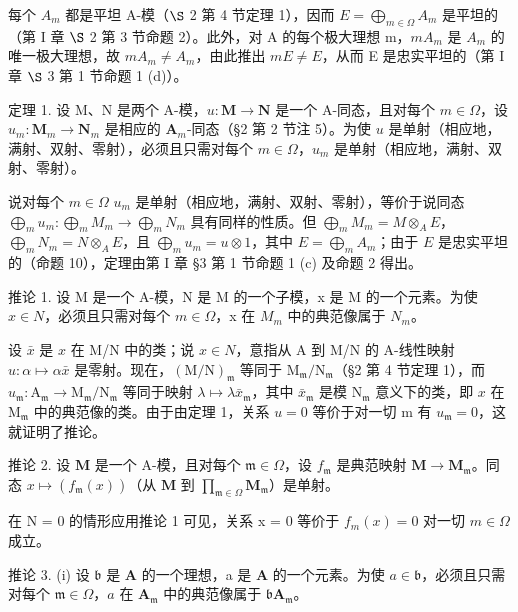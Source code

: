 每个 \(A_{m}\) 都是平坦 A-模（\(\S\) 2 第 4 节定理 1），因而 \(E = \bigoplus_{m \in \Omega} A_{m}\) 是平坦的（第 I 章 \(\S\) 2 第 3 节命题 2）。此外，对 A 的每个极大理想 m，\(mA_{m}\) 是 \(A_{m}\) 的唯一极大理想，故 \(mA_{m} \neq A_{m}\)，由此推出 \(mE \neq E\)，从而 E 是忠实平坦的（第 I 章 \(\S\) 3 第 1 节命题 1 (d)）。

定理 1. 设 M、N 是两个 A-模，\(u: \mathbf{M} \to \mathbf{N}\) 是一个 A-同态，且对每个 \(m \in \Omega\)，设 \(u_m: \mathbf{M}_m \to \mathbf{N}_m\) 是相应的 \(\mathbf{A}_m\)-同态（§2 第 2 节注 5）。为使 \(u\) 是单射（相应地，满射、双射、零射），必须且只需对每个 \(m \in \Omega\)，\(u_m\) 是单射（相应地，满射、双射、零射）。

说对每个 \(m \in \Omega\) \(u_m\) 是单射（相应地，满射、双射、零射），等价于说同态 \(\bigoplus_{m} u_m: \bigoplus_{m} M_m \to \bigoplus_{m} N_m\) 具有同样的性质。但 \(\bigoplus_{m} M_m = M \otimes_A E\)，\(\bigoplus_{m} N_m = N \otimes_A E\)，且 \(\bigoplus_{m} u_m = u \otimes 1\)，其中 \(E = \bigoplus_{m} A_m\)；由于 \(E\) 是忠实平坦的（命题 10），定理由第 I 章 §3 第 1 节命题 1 (c) 及命题 2 得出。

推论 1. 设 M 是一个 A-模，N 是 M 的一个子模，x 是 M 的一个元素。为使 \(x \in N\)，必须且只需对每个 \(m \in \Omega\)，x 在 \(M_{m}\) 中的典范像属于 \(N_{m}\)。

设 \(\bar{x}\) 是 \(x\) 在 M/N 中的类；说 \(x \in N\)，意指从 A 到 M/N 的 A-线性映射 \(u: \alpha \mapsto \alpha \bar{x}\) 是零射。现在，\((\mathrm{M} / \mathrm{N})_{\mathfrak{m}}\) 等同于 \(\mathrm{M}_{\mathfrak{m}} / \mathrm{N}_{\mathfrak{m}}\)（§2 第 4 节定理 1），而 \(u_{\mathfrak{m}}: \mathrm{A}_{\mathfrak{m}} \to \mathrm{M}_{\mathfrak{m}} / \mathrm{N}_{\mathfrak{m}}\) 等同于映射 \(\lambda \mapsto \lambda \bar{x}_{\mathfrak{m}}\)，其中 \(\bar{x}_{\mathfrak{m}}\) 是模 \(\mathrm{N}_{\mathfrak{m}}\) 意义下的类，即 \(x\) 在 \(\mathrm{M}_{\mathfrak{m}}\) 中的典范像的类。由于由定理 1，关系 \(u = 0\) 等价于对一切 m 有 \(u_{\mathfrak{m}} = 0\)，这就证明了推论。

推论 2. 设 \(\mathbf{M}\) 是一个 A-模，且对每个 \(\mathfrak{m} \in \Omega\)，设 \(f_{\mathfrak{m}}\) 是典范映射 \(\mathbf{M} \to \mathbf{M}_{\mathfrak{m}}\)。同态 \(x \mapsto (f_{\mathfrak{m}}(x))\)（从 \(\mathbf{M}\) 到 \(\prod_{\mathfrak{m} \in \Omega} \mathbf{M}_{\mathfrak{m}}\)）是单射。

在 N = 0 的情形应用推论 1 可见，关系 x = 0 等价于 \(f_{m}(x) = 0\) 对一切 \(m \in \Omega\) 成立。

推论 3. (i) 设 \(\mathfrak{b}\) 是 \(\mathbf{A}\) 的一个理想，a 是 \(\mathbf{A}\) 的一个元素。为使 \(a \in \mathfrak{b}\)，必须且只需对每个 \(\mathfrak{m} \in \Omega\)，\(a\) 在 \(\mathbf{A}_{\mathfrak{m}}\) 中的典范像属于 \(\mathfrak{b}\mathbf{A}_{\mathfrak{m}}\)。

